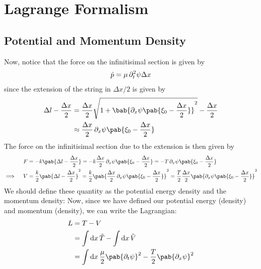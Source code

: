 \section{Lagrange Formalism}
\subsection{Potential and Momentum Density}
Now, notice that the force on the infinitisimal section is given by
\begin{align}
  \dot{p} = \mu \pdif[2]{t} \psi \Delta x
\end{align}
since the extension of the string in $\Delta x /2$ is given by
\begin{align}
  \Delta l - \frac{\Delta x}{2} & = \frac{\Delta x}{2} \sqrt{1 + \bab{\pdif{x} \psi\pab{\xi_0 -\frac{\Delta x}{2}}}^2} - \frac{\Delta x}{2} \\
                                & \approx \frac{\Delta x}{2} \pdif{x} \psi\pab{\xi_0 - \frac{\Delta x}{2}}
\end{align}
The force on the infinitisimal section due to the extension is then given by
\begin{align}
  F                & = - k \pab{\Delta l - \frac{\Delta x}{2}}
  = - k \frac{\Delta x}{2} \pdif{x} \psi\pab{\xi_0 - \frac{\Delta x}{2}}
  = - T \pdif{x} \psi\pab{\xi_0 - \frac{\Delta x}{2}}                    \\
  \implies \quad V & = \frac{k}{2} \pab{\Delta l - \frac{\Delta x}{2}}^2
  = \frac{k}{2} \pab{\frac{\Delta x}{2} \pdif{x} \psi\pab{\xi_0 - \frac{\Delta x}{2}}}^2
  = \frac{T}{2} \frac{\Delta x}{2} \pab{\pdif{x} \psi\pab{\xi_0 - \frac{\Delta x}{2}}}^2
\end{align}
We should define these quantity as the potential energy density and the momentum density:
Now, since we have defined our potential energy (density) and momentum (density), we can write the Lagrangian:
\begin{align}
  L & = T - V                                                                                    \\
    & = \int \odif{x} \, \tilde{T} - \int \odif{x} \, \tilde{V}                                  \\
    & = \int \odif{x} \, \frac{\mu}{2} \pab{\pdif{t} \psi}^2 - \frac{T}{2} \pab{\pdif{x} \psi}^2
\end{align}
